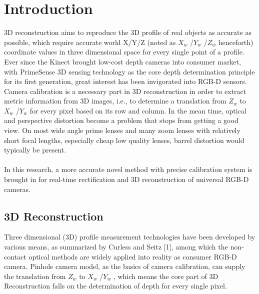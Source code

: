 
\chapter{Introduction} %
\label{sens_introduction} %


3D reconstruction aims to reproduce the 3D profile of real objects as accurate as possible, which require accurate world X/Y/Z (noted as \(X_{w}\) /\(Y_{w}\) /\(Z_{w}\)  henceforth) coordinate values in three dimensional space for every single point of a profile. Ever since the Kinect brought low-cost depth cameras into consumer market, with PrimeSense 3D sensing technology as the core depth determination principle for its first generation, great interest has been invigorated into RGB-D sensors. Camera calibration is a necessary part in 3D reconstruction in order to extract metric information from 3D images, i.e., to determine a translation from \(Z_{w}\)  to \(X_{w}\) /\(Y_{w}\)  for every pixel based on its row and column. In the mean time, optical and perspective distortion become a problem that stops from getting a good view. On most wide angle prime lenses and many zoom lenses with relatively short focal lengths,  especially cheap low quality lenses, barrel distortion would typically be present.
\\
\\In this research, a more accurate novel method with precise calibration system is brought in for real-time rectification and 3D reconstruction of universal RGB-D cameras. 
\section{3D Reconstruction}
Three dimensional (3D) profile measurement technologies have been developed by various means, as summarized by Curless and Seitz [1], %
among which the non-contact optical methods are widely applied into reality as consumer RGB-D camera. Pinhole camera model, as the basics of camera calibration, can supply the translation from \(Z_{w}\)  to \(X_{w}\) /\(Y_{w}\) , which means the core part of 3D Reconstruction falls on the determination of depth for every single pixel.

